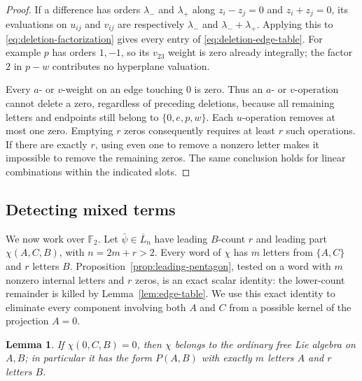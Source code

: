 \documentclass[11pt]{article}
\newtheorem{lemma}[theorem]{Lemma}
\theoremstyle{definition}
\theoremstyle{remark}
\numberwithin{equation}{section}
\begin{document}
\begin{proof}
If a difference has orders $\lambda_-$ and $\lambda_+$ along
$z_i-z_j=0$ and $z_i+z_j=0$, its evaluations on $u_{ij}$ and $v_{ij}$
are respectively $\lambda_-$ and $\lambda_-+\lambda_+$.  Applying this
to \eqref{eq:deletion-factorization} gives every entry of
\eqref{eq:deletion-edge-table}.  For example $p$ has orders $1,-1$,
so its $v_{23}$ weight is zero already integrally; the factor $2$ in
$p-w$ contributes no hyperplane valuation.

Every $a$- or $v$-weight on an edge touching $0$ is zero.  Thus an
$a$- or $v$-operation cannot delete a zero, regardless of preceding
deletions, because all remaining letters and endpoints still belong to
$\{0,e,p,w\}$.  Each $u$-operation removes at most one zero.  Emptying
$r$ zeros consequently requires at least $r$ such operations.  If there
are exactly $r$, using even one to remove a nonzero letter makes it
impossible to remove the remaining zeros.  The same conclusion holds
for linear combinations within the indicated slots.
\end{proof}

\subsection{Detecting mixed terms}
We now work over ${\mathbb F_2}$.  Let $\bar\psi\in\overline L_n$ have leading
$B$-count $r$ and leading part $\chi(A,C,B)$, with $n=2m+r>2$.
Every word of $\chi$ has $m$ letters from $\{A,C\}$ and $r$ letters
$B$.  Proposition~\ref{prop:leading-pentagon}, tested on a word with
$m$ nonzero internal letters and $r$ zeros, is an exact scalar identity:
the lower-count remainder is killed by Lemma~\ref{lem:edge-table}.
We use this exact identity to eliminate every component involving
both $A$ and $C$ from a possible kernel of the projection $A=0$.

\begin{lemma}\label{lem:deletion-kernel}
If $\chi(0,C,B)=0$, then $\chi$ belongs to the ordinary free Lie
algebra on $A,B$; in particular it has the form $P(A,B)$ with exactly
$m$ letters $A$ and $r$ letters $B$.
\end{lemma}
\end{document}
